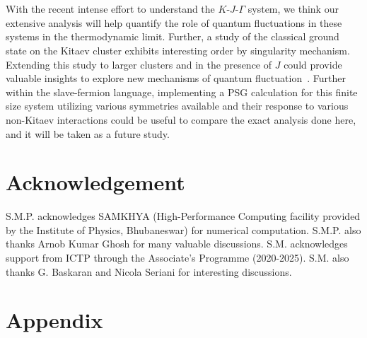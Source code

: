 \documentclass[aps,amsmath,twocolumn,amssymb,floatfix,showpacs,superscriptaddress,nofootinbib,longbibliography]{revtex4-1}
\begin{document}
\\\\\indent
With the recent intense effort to understand the $K$-$J$-$\Gamma$ system, we think our extensive analysis will help quantify the role of quantum fluctuations in these systems in the thermodynamic limit. Further, a study of the classical ground state on the Kitaev cluster exhibits interesting order by singularity mechanism\cite{sarvesh-2020,anjana-2018}. Extending this study to larger clusters and in the presence of $J$ could provide valuable insights to explore new mechanisms of quantum fluctuation~\cite{khatua-2021}. Further within the slave-fermion language, implementing a PSG calculation\cite{wen-2002,yasir-2020,atanu-2023} for this finite size system utilizing various symmetries available and their response to various non-Kitaev interactions could be useful to compare the exact analysis done here, and it will be taken as a future study.
\section*{Acknowledgement} 
S.M.P. acknowledges SAMKHYA (High-Performance Computing facility provided by the Institute of Physics, Bhubaneswar) for numerical computation. S.M.P. also thanks Arnob Kumar Ghosh for many valuable discussions. S.M. acknowledges support from ICTP through the Associate's Programme (2020-2025). S.M. also thanks G. Baskaran and Nicola Seriani for interesting discussions.
{}
\section{Appendix}
\label{appendix}
\appendix
{}
\setcounter{defcounter}{0}
\vspace{20pt}
\end{document}
